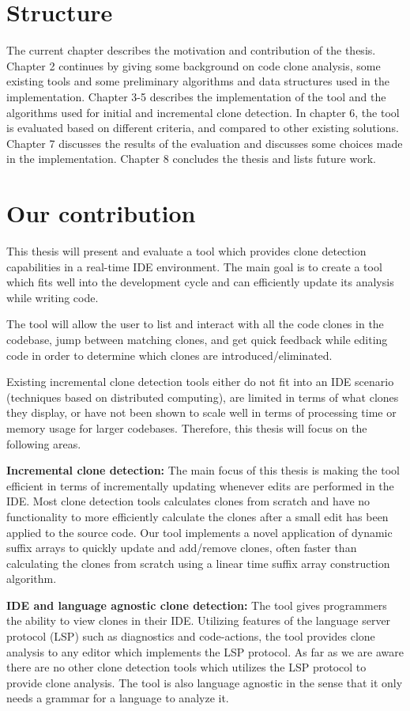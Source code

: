 \section{Structure}

The current chapter describes the motivation and contribution of the thesis. Chapter 2
continues by giving some background on code clone analysis, some existing tools and some
preliminary algorithms and data structures used in the implementation. Chapter 3-5
describes the implementation of the tool and the algorithms used for initial and
incremental clone detection. In chapter 6, the tool is evaluated based on different
criteria, and compared to other existing solutions. Chapter 7 discusses the results of the
evaluation and discusses some choices made in the implementation. Chapter 8 concludes the
thesis and lists future work.



\section{Our contribution}

This thesis will present and evaluate a tool which provides clone detection capabilities
in a real-time IDE environment. The main goal is to create a tool which fits well into the
development cycle and can efficiently update its analysis while writing code. 

The tool will allow the user to list and interact with all the code clones in the
codebase, jump between matching clones, and get quick feedback while editing code in order
to determine which clones are introduced/eliminated.

Existing incremental clone detection tools either do not fit into an IDE scenario
(techniques based on distributed computing), are limited in terms of what clones they
display, or have not been shown to scale well in terms of processing time or memory usage
for larger codebases. Therefore, this thesis will focus on the following areas.

\textbf{Incremental clone detection:} The main focus of this thesis is making the
tool efficient in terms of incrementally updating whenever edits are performed in the IDE.
Most clone detection tools calculates clones from scratch and have no functionality to
more efficiently calculate the clones after a small edit has been applied to the source
code. Our tool implements a novel application of dynamic suffix arrays to quickly update and
add/remove clones, often faster than calculating the clones from scratch using a linear
time suffix array construction algorithm.

\textbf{IDE and language agnostic clone detection:} The tool gives programmers the ability
to view clones in their IDE. Utilizing features of the language server protocol (LSP) such
as diagnostics and code-actions, the tool provides clone analysis to any editor which
implements the LSP protocol. As far as we are aware there are no other clone detection
tools which utilizes the LSP protocol to provide clone analysis. The tool is also language
agnostic in the sense that it only needs a grammar for a language to analyze it.
